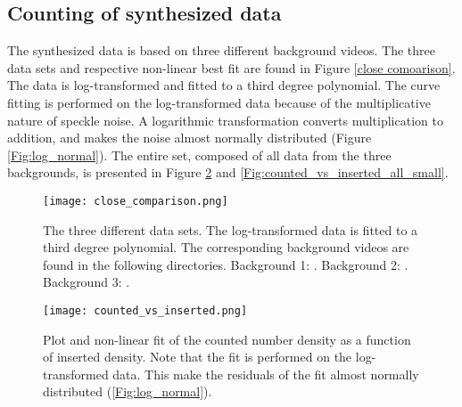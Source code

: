 \clearpage
\subsection{Counting of synthesized data}
The synthesized data is based on three different background videos. The three data sets and respective non-linear best fit are found in Figure \ref{close comoarison}. The data is log-transformed and fitted to a third degree polynomial. The curve fitting is performed on the log-transformed data because of the multiplicative nature of speckle noise. A logarithmic transformation converts multiplication to addition, and makes the noise almost normally distributed (Figure \ref{Fig:log_normal}). The entire set, composed of all data from the three backgrounds, is presented in Figure \ref{Fig:counted_vs_inserted_all} and \ref{Fig:counted_vs_inserted_all_small}.
\begin{figure}[h]
  \centering
  \texttt{[image: close\_comparison.png]}
  \cprotect\caption{The three different data sets. The log-transformed data is fitted to a third degree polynomial. The corresponding background videos are found in the following directories. Background 1: . Background 2: . Background 3: .}
  \label{Fig:close comparison}
\end{figure}

\begin{figure}[h]
  \centering
  \texttt{[image: counted\_vs\_inserted.png]}
  \caption{Plot and non-linear fit of the counted number density as a function of inserted density. Note that the fit is performed on the log-transformed data. This make the residuals of the fit almost normally distributed (\ref{Fig:log_normal}).}
  \label{Fig:counted_vs_inserted_all}
\end{figure}

